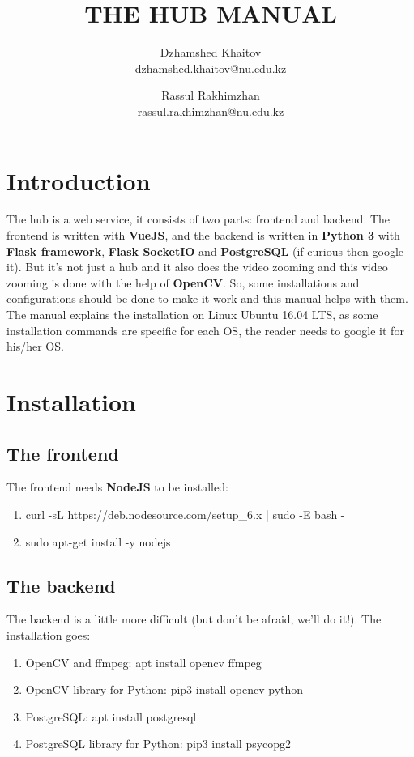\documentclass[10pt]{article}
\title {
	THE HUB MANUAL
}
\date {}
\author {
	Dzhamshed Khaitov\\
	dzhamshed.khaitov@nu.edu.kz
	\and
	Rassul Rakhimzhan\\
	rassul.rakhimzhan@nu.edu.kz
}
\begin{document}
		
\maketitle

\section{Introduction}

The hub is a web service, it consists of two parts: frontend and backend. The frontend is written with \textbf{VueJS}, and the backend is written in \textbf{Python 3} with \textbf{Flask framework}, \textbf{Flask SocketIO} and \textbf{PostgreSQL} (if curious then google it). But it's not just a hub and it also does the video zooming and this video zooming is done with the help of \textbf{OpenCV}. So, some installations and configurations should be done to make it work and this manual helps with them. The manual explains the installation on Linux Ubuntu 16.04 LTS, as some installation commands are specific for each OS, the reader needs to google it for his/her OS.

\section{Installation}
\subsection{The frontend}
The frontend needs \textbf{NodeJS} to be installed:

\begin{enumerate}
	\item curl -sL https://deb.nodesource.com/setup\_6.x | sudo -E bash -
	\item sudo apt-get install -y nodejs
\end{enumerate}

\subsection{The backend}
The backend is a little more difficult (but don't be afraid, we'll do it!). The installation goes:

\begin{enumerate}
	\item OpenCV and ffmpeg: apt install opencv ffmpeg
	\item OpenCV library for Python: pip3 install opencv-python
	\item PostgreSQL: apt install postgresql
	\item PostgreSQL library for Python: pip3 install psycopg2
\end{enumerate}
\end{document}
